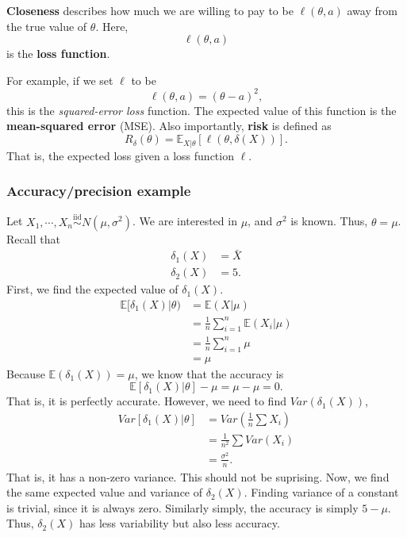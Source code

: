 \documentclass[titlepage, 12pt, leqno]{article}
\begin{document}
\begin{definition}
    \textbf{Closeness} describes how much we are willing to pay to be
    $\ell(\theta,a)$ away from the true value of $\theta$. Here,
    \[
    \ell(\theta, a)
    \]
    is the \textbf{loss function}.
\end{definition}

For example, if we set $\ell$ to be
\[
\ell(\theta,a) = (\theta-a)^{2},
\]
this is the \textit{squared-error loss} function. The expected value of this
function is the \textbf{mean-squared error} (MSE). Also importantly,
\textbf{risk} is defined as
\[
    R_{\delta}(\theta) = \mathbb{E}_{X|\theta}[\ell(\theta, \delta(X))].
\]
That is, the expected loss given a loss function $\ell$.

\subsubsection{Accuracy/precision example}
Let $X_{1}, \cdots , X_{n} \overset{\mathrm{iid}}{\sim} N(\mu, \sigma^{2})$. We
are interested in $\mu$, and $\sigma^{2}$ is known. Thus, $\theta = \mu$. Recall
that
\begin{align*}
    \delta_{1}(X) &= \bar X\\
    \delta_{2}(X) &= 5.
\end{align*}
First, we find the expected value of $\delta_{1}(X)$.
\begin{align*}
    \mathbb{E}[\delta_{1}(X)|\theta) &= \mathbb{E}(X|\mu) \\
                                     &= \frac{1}{n} \sum_{i=1}^{n}
                                     \mathbb{E}(X_{i}|\mu) \\
                                     &= \frac{1}{n}\sum_{i=1}^{n}\mu \\
                                     &= \mu
\end{align*}
Because $\mathbb{E}(\delta_{1}(X)) = \mu$, we know that the accuracy is
\[
    \mathbb{E}[\delta_{1}(X)|\theta] - \mu = \mu - \mu = \boxed{0}.
\]
That is, it is perfectly accurate. However, we need to find $Var(\delta_{1}(X))$,
\begin{align*}
    Var[\delta_{1}(X)|\theta] &= Var\left(\frac{1}{n}\sum X_{i}\right) \\
                              &= \frac{1}{n^{2}}\sum Var(X_{i}) \\
                              &= \frac{\sigma^{2}}{n}.
\end{align*}
That is, it has a non-zero variance. This should not be suprising. Now, we find
the same expected value and variance of $\delta_{2}(X)$. Finding variance of a
constant is trivial, since it is always zero. Similarly simply, the accuracy is
simply $5-\mu$. Thus, $\delta_{2}(X)$ has less variability but also less
accuracy.
\end{document}
